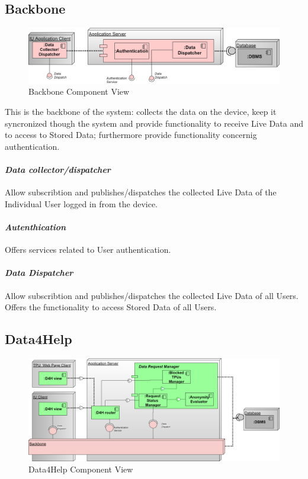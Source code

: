 \subsection{Backbone}
\label{subsect:backboneComponentView}
\begin{figure}[H]
\caption{Backbone Component View}
\includegraphics[width = \textwidth]{sections/architecturalDesign/BackboneDiagram.png}
\end{figure}
This is the backbone of the system: collects the data on the device, keep it syncronized though the system and provide functionality to receive Live Data and to access to Stored Data; furthermore provide functionality concernig authentication.
\paragraph{\textit{Data collector/dispatcher}} Allow subscribtion and publishes/dispatches the collected Live Data of the Individual User logged in from the device. 
\paragraph{\textit{Autenthication}} Offers services related to  User authentication.
\paragraph{\textit{Data Dispatcher}} Allow subscribtion and publishes/dispatches the collected Live Data of all Users. Offers the functionality to access Stored Data of all Users.
\clearpage
\subsection{Data4Help}
\label{subsect:D4HComponentView}
\begin{figure}[H]
\caption{Data4Help Component View}
\includegraphics[width = \textwidth]{sections/architecturalDesign/D4HDiagram.png}
\end{figure}
